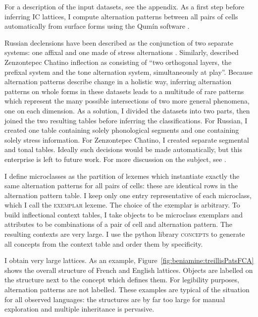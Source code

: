 \documentclass[output=paper]{langscibook}
\begin{document}
    For a description of the input datasets, see the appendix. As a first step before inferring IC lattices, I compute alternation patterns between all pairs of cells automatically from surface forms using the Qumín software \citep{Beniamine2017,BeniaminePhd}.

    Russian declensions have been described as the conjunction of two separate systems: one affixal and one made of stress alternations \citep{BrownHippisley2012}. Similarly, \citet{Campbell2016} described Zenzontepec Chatino inflection as consisting of ``two orthogonal layers, the prefixal system and the tone alternation system, simultaneously at play''. Because alternation patterns describe change in a holistic way, inferring alternation patterns on whole forms in these datasets leads to a multitude of rare patterns which represent the many possible intersections of two more general phenomena, one on each dimension. As a solution, I divided the datasets into two parts, then joined the two resulting tables before inferring the classifications. For Russian, I created one table containing solely phonological segments and one containing solely stress information. For Zenzontepec Chatino, I created separate segmental and tonal tables. Ideally such decisions would be made automatically, but this enterprise is left to future work. For more discussion on the subject, see \citet{BeniaminePhd}.

    I define microclasses as the partition of lexemes which instantiate exactly the same alternation patterns for all pairs of cells: these are identical rows in the alternation pattern table. I keep only one entry representative of each microclass, which I call the \textsc{exemplar} lexeme. The choice of the exemplar is arbitrary. To build inflectional context tables, I take objects to be microclass exemplars and attributes to be combinations of a pair of cell and alternation pattern. The resulting contexts are very large. I use the python library \textsc{concepts} \citep{Bank2016} to generate all concepts from the context table and order them by specificity.

    I obtain very large lattices. As an example, Figure~\ref{fig:beniamine:treillisPatsFCA} shows the overall structure of French and English lattices. Objects are labelled on the structure next to the concept which defines them. For legibility purposes, alternation patterns are not labelled. These examples are typical of the situation for all observed languages: the structures are by far too large for manual exploration and multiple inheritance is pervasive.
\end{document}
